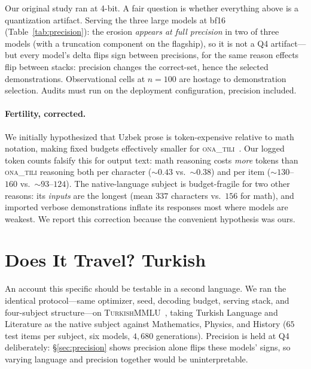 \documentclass[11pt]{article}
\newcommand{\ona}{\textsc{ona\_tili}}
\begin{document}
Our original study ran at 4-bit. A fair question is whether everything above is a
quantization artifact. Serving the three large models at bf16
(Table~\ref{tab:precision}): the erosion \emph{appears at full precision} in two of
three models (with a truncation component on the flagship), so it is not a Q4
artifact---but every model's delta flips sign between precisions, for the same reason
effects flip between stacks: precision changes the correct-set, hence the selected
demonstrations. Observational cells at $n{=}100$ are hostage to demonstration
selection. Audits must run on the deployment configuration, precision included.

\paragraph{Fertility, corrected.} We initially hypothesized that Uzbek prose is
token-expensive relative to math notation, making fixed budgets effectively smaller
for \ona{}~\citep[cf.][]{petrov2023tokenizer,lundin2025tokentax}. Our logged token
counts falsify this for output text: math reasoning costs \emph{more} tokens than
\ona{} reasoning both per character (${\sim}0.43$ vs.\ ${\sim}0.38$) and per item
(${\sim}130$--$160$ vs.\ ${\sim}93$--$124$). The native-language subject is
budget-fragile for two other reasons: its \emph{inputs} are the longest (mean $337$
characters vs.\ $156$ for math), and imported verbose demonstrations inflate its
responses most where models are weakest. We report this correction because the
convenient hypothesis was ours.

\section{Does It Travel? Turkish}\label{sec:travel}

An account this specific should be testable in a second language. We ran the identical
protocol---same optimizer, seed, decoding budget, serving stack, and four-subject
structure---on \textsc{TurkishMMLU}~\citep{turkishmmlu2024}, taking Turkish Language and
Literature as the native subject against Mathematics, Physics, and History
($65$ test items per subject, six models, $4{,}680$ generations). Precision is held at
Q4 deliberately: \S\ref{sec:precision} shows precision alone flips these models' signs,
so varying language and precision together would be uninterpretable.
\end{document}
